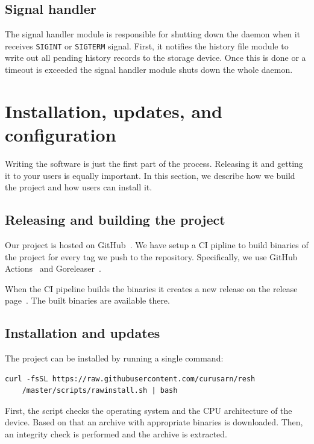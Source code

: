 \documentclass[thesis=M,english]{FITthesis}[2012/10/20]
\let\myCite\cite
\renewcommand\cite{\unskip~\myCite}
\begin{document}
\subsection{Signal handler}

The signal handler module is responsible for shutting down the daemon when it receives \verb|SIGINT| or \verb|SIGTERM| signal. First, it notifies the history file module to write out all pending history records to the storage device. Once this is done or a timeout is exceeded the signal handler module shuts down the whole daemon.


\section{Installation, updates, and configuration}

Writing the software is just the first part of the process. Releasing it and getting it to your users is equally important. In this section, we describe how we build the project and how users can install it.

\subsection{Releasing and building the project}

Our project is hosted on GitHub\cite{resh-github-homepage}. We have setup a CI pipline to build binaries of the project for every tag we push to the repository. Specifically, we use GitHub Actions\cite{github-actions} and Goreleaser\cite{tools-goreleaser}.

When the CI pipeline builds the binaries it creates a new release on the release page\cite{resh-github-releases}. The built binaries are available there. 

\subsection{Installation and updates}

The project can be installed by running a single command:

\begin{verbatim}
curl -fsSL https://raw.githubusercontent.com/curusarn/resh
    /master/scripts/rawinstall.sh | bash
\end{verbatim}

First, the script checks the operating system and the CPU architecture of the device. Based on that an archive with appropriate binaries is downloaded. Then, an integrity check is performed and the archive is extracted. 
\end{document}

